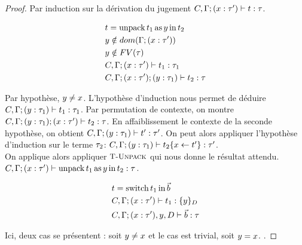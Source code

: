 \pagebreak
\begin{lemma}
\begin{mathpar}
\end{mathpar}

\begin{proof}
Par induction sur la dérivation du jugement
  $\tycheck{\csenv, \tyenvcons\tyenv\var{\ty'}}{\term}{\ty}$.
  
\begin{equation*}
\begin{aligned}
  & \term = \kw{unpack} \term_1 \kw{as} y \kw{in} \term_2 \\
  & y \notin dom(\tyenvcons\tyenv\var{\ty'}) \\
  & y \notin FV(\ty) \\
  & \tycheck{\csenv, \tyenvcons\tyenv\var{\ty'}}{\term_1}{\ty_1} \\
  & \tycheck{\csenv, \tyenvcons{\tyenvcons\tyenv\var{\ty'}}{y}{\ty_1}}{\term_2}{\ty}
\end{aligned}
\end{equation*}

Par hypothèse, $y \neq \var$.
L'hypothèse d'induction nous permet de déduire 
  $\tycheck{\csenv, \tyenvcons\tyenv{y}{\ty_1}}{\term_1}{\ty_1}$.
Par permutation de contexte, on montre
  $\tycheck{\csenv, \tyenvcons{\tyenvcons\tyenv{y}{\ty_1}}\var{\ty'}}{\term_2}{\ty}$.
En affaiblissement le contexte de la seconde hypothèse, on obtient
  $\tycheck{\csenv, \tyenvcons\tyenv{y}{\ty_1}}{\term'}{\ty'}$.
On peut alors appliquer l'hypothèse d'induction sur le terme $\ty_2$:
  $\tycheck{\csenv, \tyenvcons\tyenv{y}{\ty_1}}{\term_2\{\var \leftarrow \term'\}}{\ty'}$.
\\
On applique alors appliquer $\rref{T-Unpack}$ qui nous donne le résultat attendu.
  $\tycheck{\csenv, \tyenvcons\tyenv\var{\ty'}}
           {\kw{unpack} \term_1 \kw{as} y \kw{in} \term_2}{\ty}$.

\begin{equation*}
\begin{aligned}
  & \term = \kw{switch} \term_1 \kw{in} \vec{b} \\
  & \tycheck{\csenv, \tyenvcons\tyenv\var{\ty'}}{\term_1}{\{y\}_D} \\
  & \tycheck{\csenv, \tyenvcons\tyenv\var{\ty'}, y, D}{\vec{b}}{\ty}
\end{aligned}
\end{equation*}

Ici, deux cas se présentent : soit $y \neq \var$ et le cas est trivial, soit $y = \var$.
.


\end{proof}
\end{lemma}

